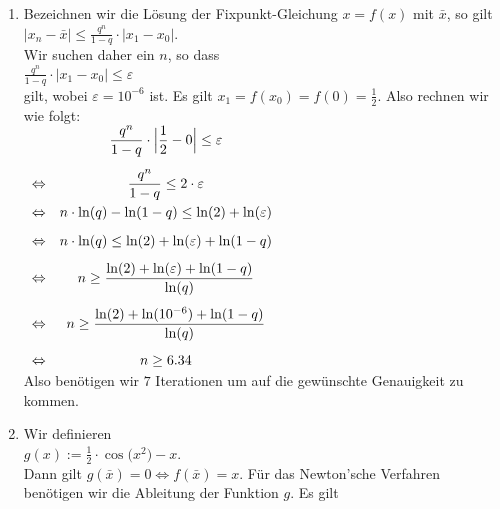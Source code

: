 \documentclass{article}
\newcommand{\ds}{\displaystyle}
\begin{document}
\begin{enumerate}
\item Bezeichnen wir die L\"osung der Fixpunkt-Gleichung $x = f(x)$ mit $\bar{x}$, so gilt
      \\[0.2cm]
      \hspace*{1.3cm}
      $\ds |x_n - \bar{x}| \leq \frac{q^n}{1- q} \cdot  |x_1 - x_0|$.
      \\[0.2cm]
      Wir suchen daher ein $n$, so dass
      \\[0.2cm]
      \hspace*{1.3cm}
      $\ds \frac{q^n}{1- q} \cdot  |x_1 - x_0| \leq \varepsilon$
      \\[0.2cm]
      gilt, wobei $\varepsilon = 10^{-6}$ ist.  Es gilt $x_1 = f(x_0) = f(0) = \frac{1}{2}$.
      Also rechnen wir wie folgt:
      \\[0.2cm]
      \hspace*{1.3cm}
      $
      \begin{array}[t]{lcl}
                        & \ds \frac{q^n}{1- q} \cdot  \Bigl|\frac{1}{2} - 0\Bigr| \leq \varepsilon \\[0.5cm]
        \Leftrightarrow & \ds \frac{q^n}{1- q} \leq 2 \cdot \varepsilon \\[0.3cm]
        \Leftrightarrow & \ds n \cdot  \ln(q) - \ln(1 - q) \leq \ln(2) + \ln(\varepsilon) \\[0.3cm]
        \Leftrightarrow & \ds n \cdot  \ln(q) \leq \ln(2) + \ln(\varepsilon) + \ln(1 - q) \\[0.3cm]
        \Leftrightarrow & \ds n \geq \frac{\ln(2) + \ln(\varepsilon) + \ln(1 - q)}{\ln(q)} \\[0.5cm]
        \Leftrightarrow & \ds n \geq \frac{\ln(2) + \ln(10^{-6}) + \ln(1 - q)}{\ln(q)} \\[0.5cm]
        \Leftrightarrow & \ds n \geq 6.34
      \end{array} 
      $
      \\[0.2cm]
      Also ben\"otigen wir $7$ Iterationen um auf die gew\"unschte Genauigkeit zu kommen.
\item Wir definieren 
      \\[0.2cm]
      \hspace*{1.3cm}
      $\ds g(x) := \frac{1}{2} \cdot \cos\bigl(x^2\bigr) - x$.
      \\[0.2cm]
      Dann gilt $g(\bar{x}) = 0 \Leftrightarrow f(\bar{x}) = x$.  F\"ur das Newton'sche Verfahren
      ben\"otigen wir die Ableitung der Funktion $g$.  Es gilt
      \\[0.2cm]
      \hspace*{1.3cm}

\end{enumerate}
\end{document}
